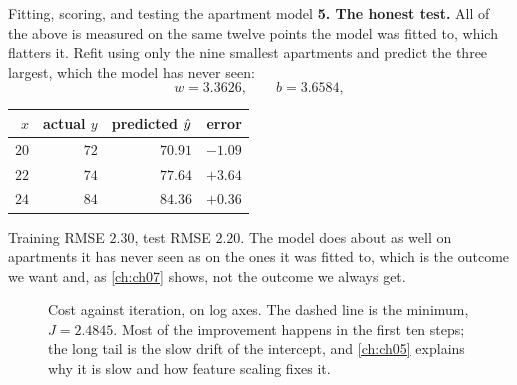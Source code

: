 \begin{workedexample}{Fitting, scoring, and testing the apartment model}
\textbf{5. The honest test.} All of the above is measured on the same twelve
points the model was fitted to, which flatters it. Refit using only the nine
smallest apartments and predict the three largest, which the model has never
seen:
\[
  w = 3.3626,\qquad b = 3.6584,
\]
\begin{center}
\small
\begin{tabular}{@{}rrrr@{}}
\toprule
$x$ & actual $y$ & predicted $\hat{y}$ & error\\
\midrule
$20$ & $72$ & $70.91$ & $-1.09$\\
$22$ & $74$ & $77.64$ & $+3.64$\\
$24$ & $84$ & $84.36$ & $+0.36$\\
\bottomrule
\end{tabular}
\end{center}
Training RMSE $2.30$, test RMSE $2.20$. The model does about as well on
apartments it has never seen as on the ones it was fitted to, which is the
outcome we want and, as \cref{ch:ch07} shows, not the outcome we always get.
\end{workedexample}

\begin{figure}[htbp]
  \centering
  \caption{Cost against iteration, on log axes. The dashed line is the minimum,
  $J=2.4845$. Most of the improvement happens in the first ten steps; the long
  tail is the slow drift of the intercept, and \cref{ch:ch05} explains why it is
  slow and how feature scaling fixes it.}
  \label{fig:gd-trace}
\end{figure}

